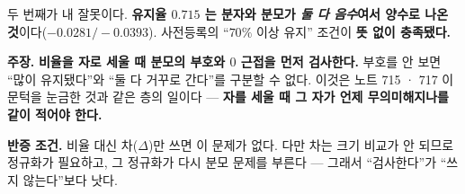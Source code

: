 \documentclass[10pt,a4paper]{article}
\newcommand{\claim}[2]{\begin{claimbox}\textbf{주장.} #1\par\smallskip
  \textcolor{gray!70}{\textbf{반증 조건.} #2}\end{claimbox}}
\begin{document}
두 번째가 내 잘못이다. \textbf{유지율 $0.715$ 는 분자와 분모가 \emph{둘 다 음수}여서
양수로 나온 것}이다($-0.0281 / -0.0393$). 사전등록의 ``$70\%$ 이상 유지'' 조건이
\textbf{뜻 없이 충족됐다.}

\claim{\textbf{비율을 자로 세울 때 분모의 부호와 $0$ 근접을 먼저 검사한다.} 부호를
안 보면 ``많이 유지됐다''와 ``둘 다 거꾸로 간다''를 구분할 수 없다. 이것은 노트
715 · 717 이 문턱을 눈금한 것과 같은 층의 일이다 --- \textbf{자를 세울 때 그 자가
언제 무의미해지나를 같이 적어야 한다.}}
{비율 대신 차($\Delta$)만 쓰면 이 문제가 없다. 다만 차는 크기 비교가 안 되므로
정규화가 필요하고, 그 정규화가 다시 분모 문제를 부른다 --- 그래서 ``검사한다''가
``쓰지 않는다''보다 낫다.}
\end{document}
